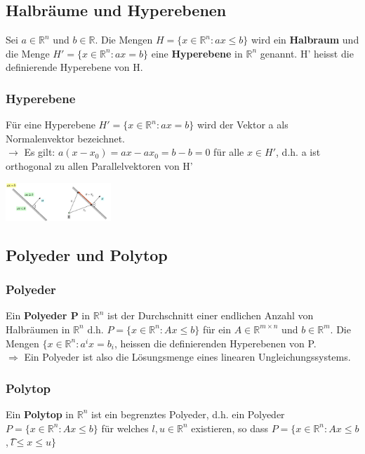 \documentclass{report}
\newenvironment{Figure}
	{\par\medskip\noindent\minipage{\linewidth}}
	{\endminipage\par\medskip}
\theoremstyle{definition}
\theoremstyle{example}
\begin{document}
   \subsection{Halbräume und Hyperebenen}
Sei $a \in \mathbb{R}^n$ und $b \in \mathbb{R}$. Die Mengen $H = \{x \in \mathbb{R}^n : ax \leq b \}$ wird ein \textbf{Halbraum} und die Menge $H' = \{ x \in \mathbb{R}^n: ax = b\}$ eine \textbf{Hyperebene} in $\mathbb{R}^n$
genannt. H' heisst die definierende Hyperebene von H. 
      \subsubsection{Hyperebene}
Für eine Hyperebene $H' = \{ x \in \mathbb{R}^n: ax = b\}$ wird der Vektor a als Normalenvektor bezeichnet.\\

$\rightarrow$ Es gilt: $a(x-x_0) = ax - ax_0 = b - b = 0$ für alle $x \in H'$, d.h. a ist orthogonal zu allen Parallelvektoren von H'

\begin{Figure}
\centering
\includegraphics[width=150px]{img/Hyperebene.png}
	\label{fig:Abbildung einer Hyperebene}
\end{Figure}

   \subsection{Polyeder und Polytop}
      \subsubsection{Polyeder}
Ein \textbf{Polyeder P} in $\mathbb{R}^n$ ist der Durchschnitt einer endlichen Anzahl von Halbräumen in $\mathbb{R}^n$ d.h. $P = \{ x \in \mathbb{R}^n: Ax \leq b\}$ für ein $A \in \mathbb{R}^{m \times n}$
und $b \in \mathbb{R}^m$. Die Mengen $\{ x \in \mathbb{R}^n: a^i x = b_i$, heissen die definierenden Hyperebenen von P. \\
$\Rightarrow$ Ein Polyeder ist also die Lösungsmenge eines linearen Ungleichungssystems.


      \subsubsection{Polytop}
Ein \textbf{Polytop} in $\mathbb{R}^n$ ist ein begrenztes Polyeder, d.h. ein Polyeder $P = \{ x \in \mathbb{R}^n: Ax \leq b \}$ für welches $l, u \in \mathbb{R}^n$ existieren, so dass
$P = \{ x \in \mathbb{R}^n: Ax \leq b $, \t $l \leq x \leq u \}$
\end{document}
